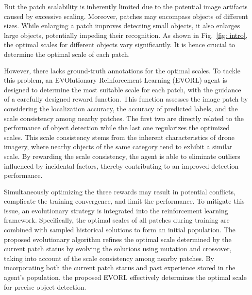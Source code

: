 \documentclass[letterpaper]{article} %
\newcommand\rjf[1]{\textcolor{red}{\{RJF: #1\}}}
\begin{document}
But the patch scalability is inherently limited %
due to the potential image artifacts caused by excessive scaling. 
Moreover, patches may encompass objects of different sizes. While enlarging a patch improves detecting small objects, it also enlarges large objects, potentially impeding their recognition. As shown in Fig.~\ref{fig: intro}, the optimal scales for different objects vary significantly. It is hence crucial to determine the optimal scale of each patch. 


However, there lacks ground-truth annotations for the optimal scales. To tackle this problem, an EVOlutionary Reinforcement Learning (EVORL) agent is designed to determine the most suitable scale for each patch, with the guidance of a carefully designed reward function. This function assesses the image patch by considering the localization accuracy, the accuracy of predicted labels, and the scale consistency among nearby patches. The first two are directly related to the performance of object detection while the last one regularizes the optimized scales. This scale consistency stems from the inherent characteristics of drone imagery, where nearby objects of the same category tend to exhibit a similar scale. By rewarding the scale consistency, the agent is able to eliminate outliers influenced by incidental factors, thereby contributing to an improved detection performance. 


Simultaneously optimizing the three rewards may result in potential conflicts, complicate the training convergence, and limit the performance. To mitigate this issue, an evolutionary strategy is integrated into the reinforcement learning framework. Specifically, the optimal scales of all patches during training are combined with sampled historical solutions to form an initial population. The proposed evolutionary algorithm refines the optimal scale determined by the current patch status by evolving the solutions using mutation and crossover, taking into account of the scale consistency among nearby patches. By incorporating both the current patch status and past experience stored in the agent's population, the proposed EVORL effectively determines the optimal scale for precise object detection.
\end{document}
